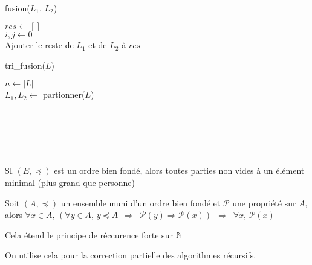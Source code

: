 \begin{example}\enspace\\
	\begin{algorithm}[H]
		\caption{fusion($L_1$, $L_2$)}
		$res \gets []$\\
		$i,j \gets 0$\\
		Ajouter le reste de $L_1$ et de $L_2$ à $res$\\
	\end{algorithm}

	\begin{algorithm}[H]
		\caption{tri\_fusion($L$)}
		$n \gets |L|$\\
		$L_1, L_2 \gets$ partionner($L$)\\
	\end{algorithm}
\end{example}







\enspace \\\\\\\\\newpage

\begin{proposition}
	SI $(E, \preceq)$ est un ordre bien fondé, alors toutes parties non vides à un élément minimal (plus grand que personne)
\end{proposition}

\begin{theorem}
	\label{1-4}
	Soit $(A, \preceq)$ un ensemble muni d'un ordre bien fondé et $\mathcal P$ une propriété sur $A$, alors $\forall x \in A, \, (\forall y \in A, \, y \preceq A \enspace \Rightarrow \enspace \mathcal P(y) \Rightarrow \mathcal P(x)) \enspace \Rightarrow \enspace \forall x ,\, \mathcal P(x)$
\end{theorem}

\begin{rem}
	Cela étend le principe de réccurence forte sur $\mathbb{N}$
\end{rem}

On utilise cela pour la correction partielle des algorithmes récursifs.

